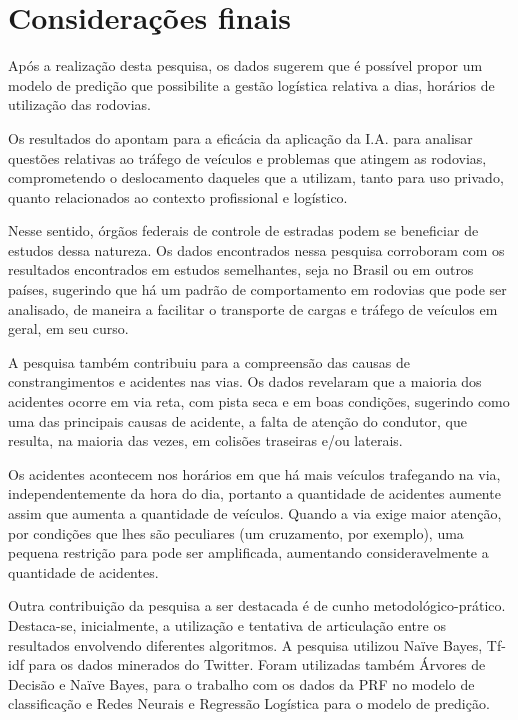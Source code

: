 \chapter{Considerações finais}\label{intro:resumen}

Após a realização desta pesquisa, os dados sugerem que é possível propor um modelo de predição que possibilite a gestão logística relativa a dias, horários de utilização das rodovias.  

Os resultados do apontam para a eficácia da aplicação da
I.A. para analisar questões relativas ao tráfego de veículos e
problemas que atingem as rodovias, comprometendo o
deslocamento daqueles que a utilizam, tanto para uso privado,
quanto relacionados ao contexto profissional e logístico. 

Nesse sentido, órgãos federais de controle de estradas podem se beneficiar de estudos dessa natureza. 
Os dados encontrados nessa pesquisa corroboram com os resultados encontrados em estudos semelhantes, seja no Brasil ou em outros países, sugerindo que há um padrão de comportamento em rodovias que pode ser analisado, de
maneira a facilitar o transporte de cargas e tráfego de veículos em geral, em seu curso. 

A pesquisa também contribuiu para a compreensão das causas de constrangimentos e acidentes nas vias. Os dados revelaram que a maioria dos acidentes ocorre em via reta, com pista seca e em boas condições, sugerindo como uma das principais causas de acidente, a falta de atenção do condutor, que resulta, na maioria das vezes, em colisões traseiras e/ou laterais.

Os acidentes acontecem nos horários em que há mais veículos trafegando na via, independentemente da hora do dia, portanto a quantidade de acidentes aumente assim que aumenta a quantidade de veículos. Quando a via exige maior atenção, por condições que lhes são peculiares (um cruzamento, por exemplo), uma pequena restrição para pode ser amplificada, aumentando consideravelmente a quantidade de acidentes.

Outra contribuição da pesquisa a ser destacada é de cunho metodológico-prático. Destaca-se, inicialmente, a utilização e tentativa de articulação entre os resultados envolvendo diferentes algoritmos.
A pesquisa utilizou Naïve Bayes, Tf-idf para os dados minerados do Twitter. 
Foram utilizadas também Árvores de Decisão e  Naïve Bayes, para o trabalho com os dados da PRF no modelo de classificação e   Redes Neurais e Regressão Logística para o modelo de predição.  

